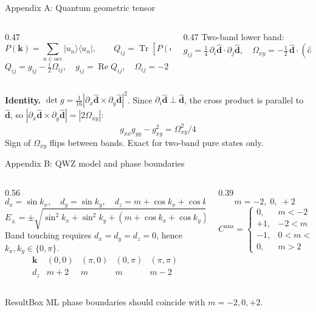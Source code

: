 \documentclass[aspectratio=169,11pt]{beamer}
\newcommand{\ANA}{\mathrm{ana}}
\newenvironment{ResultBox}
{\begin{beamercolorbox}[rounded=true,sep=0.40em]{ResultBox}}
{\end{beamercolorbox}}
\begin{document}
\appendix

\begin{frame}{Appendix A: Quantum geometric tensor}
\scriptsize
\begin{columns}[T]
\begin{column}{0.47\textwidth}
\[
P(\mathbf k)=\sum_{n\in\mathrm{occ}}|u_n\rangle\langle u_n|,
\qquad
Q_{ij}=\operatorname{Tr}[P(\partial_iP)(\partial_jP)]
\]
\[
Q_{ij}=g_{ij}-\tfrac i2\Omega_{ij},\quad
g_{ij}=\operatorname{Re}Q_{ij},\quad
\Omega_{ij}=-2\operatorname{Im}Q_{ij}
\]
\end{column}
\begin{column}{0.47\textwidth}
Two-band lower band:
\[
g_{ij}=\tfrac14\,\partial_i\hat{\mathbf d}\!\cdot\!\partial_j\hat{\mathbf d},\quad
\Omega_{xy}=-\tfrac12\,\hat{\mathbf d}\!\cdot\!(\partial_x\hat{\mathbf d}\times\partial_y\hat{\mathbf d})
\]
\end{column}
\end{columns}

\vspace{0.1cm}
\textbf{Identity.} $\det g=\tfrac1{16}|\partial_x\hat{\mathbf d}\times\partial_y\hat{\mathbf d}|^2$.
Since $\partial_i\hat{\mathbf d}\perp\hat{\mathbf d}$, the cross product is parallel to $\hat{\mathbf d}$,
so $|\partial_x\hat{\mathbf d}\times\partial_y\hat{\mathbf d}|=|2\Omega_{xy}|$:
\[
\boxed{g_{xx}g_{yy}-g_{xy}^2=\Omega_{xy}^2/4}
\]
Sign of $\Omega_{xy}$ flips between bands. Exact for two-band pure states only.
\end{frame}

\begin{frame}{Appendix B: QWZ model and phase boundaries}
\scriptsize
\begin{columns}[T]
\begin{column}{0.56\textwidth}
\[
d_x=\sin k_x,\quad d_y=\sin k_y,\quad d_z=m+\cos k_x+\cos k_y
\]
\[
E_\pm=\pm\sqrt{\sin^2k_x+\sin^2k_y+(m+\cos k_x+\cos k_y)^2}
\]
Band touching requires $d_x=d_y=d_z=0$, hence $k_x,k_y\in\{0,\pi\}$.
\[
\begin{array}{c|cccc}
\mathbf k&(0,0)&(\pi,0)&(0,\pi)&(\pi,\pi)\\ \hline
d_z&m+2&m&m&m-2
\end{array}
\]
\end{column}
\begin{column}{0.39\textwidth}
\[
\boxed{m=-2,\;0,\;+2}
\]
\[
\boxed{
C^{\ANA}=\begin{cases}
0,&m<-2\\+1,&-2<m<0\\-1,&0<m<2\\0,&m>2
\end{cases}}
\]
\end{column}
\end{columns}
\vfill
\begin{ResultBox}\centering
ML phase boundaries should coincide with $m=-2,0,+2$.
\end{ResultBox}
\end{frame}
\end{document}
